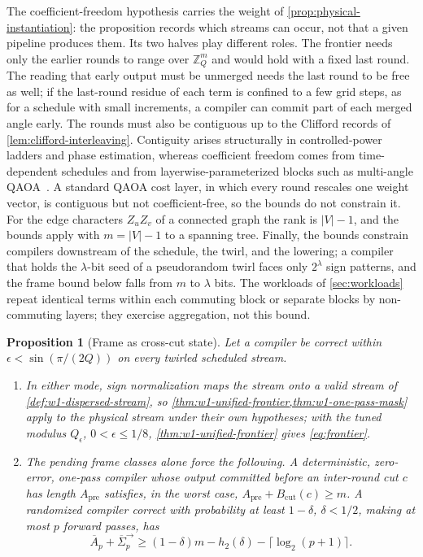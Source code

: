 \documentclass[aps,prx,reprint,superscriptaddress,floatfix,longbibliography]{revtex4-2}
\newtheorem{proposition}{Proposition}
\begin{document}
The coefficient-freedom hypothesis carries the weight of
\cref{prop:physical-instantiation}: the proposition records which streams
can occur, not that a given pipeline produces them.  Its two halves play
different roles.  The frontier needs only the earlier rounds to range over
$\mathbb Z_Q^m$ and would hold with a fixed last round.  The reading that
early output must be unmerged needs the last round to be free as well; if
the last-round residue of each term is confined to a few grid steps, as
for a schedule with small increments, a compiler can commit part of each
merged angle early.  The rounds must also be contiguous up to the Clifford
records of \cref{lem:clifford-interleaving}.  Contiguity arises
structurally in controlled-power ladders and phase estimation, whereas
coefficient freedom comes from time-dependent schedules and from
layerwise-parameterized blocks such as multi-angle
QAOA~\cite{herrman2022multiangle}.  A standard QAOA cost layer, in which
every round rescales one weight vector, is contiguous but not
coefficient-free, so the bounds do not constrain it.  For the edge
characters $Z_uZ_v$ of a connected graph the rank is $|V|-1$, and the
bounds apply with $m=|V|-1$ to a spanning tree.  Finally, the bounds
constrain compilers downstream of the schedule, the twirl, and the
lowering; a compiler that holds the $\lambda$-bit seed of a pseudorandom
twirl faces only $2^\lambda$ sign patterns, and the frame bound below
falls from $m$ to $\lambda$ bits.  The workloads of \cref{sec:workloads}
repeat identical terms within each commuting block or separate blocks by
non-commuting layers; they exercise aggregation, not this bound.

\begin{proposition}[Frame as cross-cut state]
\label{prop:frame-cross-cut}
Let a compiler be correct within $\epsilon<\sin(\pi/(2Q))$ on every
twirled scheduled stream.
\begin{enumerate}[leftmargin=1.9em,label=(\roman*),topsep=2pt,itemsep=1pt]
\item In either mode, sign normalization maps the stream onto a valid
stream of \cref{def:w1-dispersed-stream}, so
\cref{thm:w1-unified-frontier,thm:w1-one-pass-mask} apply to the physical
stream under their own hypotheses; with the tuned modulus $Q_\epsilon$,
$0<\epsilon\leq1/8$, \cref{thm:w1-unified-frontier} gives
\cref{eq:frontier}.
\item The pending frame classes alone force the following.  A
deterministic, zero-error, one-pass compiler whose output committed before
an inter-round cut $c$ has length $A_{\mathrm{pre}}$ satisfies, in the
worst case, $A_{\mathrm{pre}}+B_{\mathrm{cut}}(c)\geq m$.  A randomized
compiler correct with probability at least $1-\delta$, $\delta<1/2$,
making at most $p$ forward passes, has
\begin{equation}\label{eq:frame-lower-multipass}
 \overline A_p+\overline\Sigma^{\to}_p
 \geq(1-\delta)m-h_2(\delta)-\lceil\log_2(p+1)\rceil .
\end{equation}
\end{enumerate}
\end{proposition}
\end{document}
